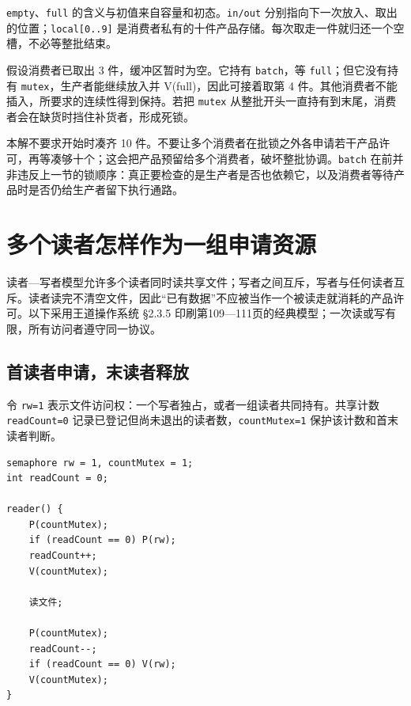\texttt{empty}、\texttt{full} 的含义与初值来自容量和初态。\texttt{in/out} 分别指向下一次放入、取出的位置；\texttt{local{[}0..9{]}} 是消费者私有的十件产品存储。每次取走一件就归还一个空槽，不必等整批结束。

假设消费者已取出 3 件，缓冲区暂时为空。它持有 \texttt{batch}，等 \texttt{full}；但它没有持有 \texttt{mutex}，生产者能继续放入并 V(full)，因此可接着取第 4 件。其他消费者不能插入，所要求的连续性得到保持。若把 \texttt{mutex} 从整批开头一直持有到末尾，消费者会在缺货时挡住补货者，形成死锁。

本解不要求开始时凑齐 10 件。不要让多个消费者在批锁之外各申请若干产品许可，再等凑够十个；这会把产品预留给多个消费者，破坏整批协调。\texttt{batch} 在前并非违反上一节的锁顺序：真正要检查的是生产者是否也依赖它，以及消费者等待产品时是否仍给生产者留下执行通路。

\section{多个读者怎样作为一组申请资源}\label{sec-readers}

读者---写者模型允许多个读者同时读共享文件；写者之间互斥，写者与任何读者互斥。读者读完不清空文件，因此``已有数据''不应被当作一个被读走就消耗的产品许可。以下采用王道操作系统 §2.3.5 印刷第109---111页的经典模型；一次读或写有限，所有访问者遵守同一协议。

\subsection{首读者申请，末读者释放}\label{ux9996ux8bfbux8005ux7533ux8bf7ux672bux8bfbux8005ux91caux653e}

令 \texttt{rw=1} 表示文件访问权：一个写者独占，或者一组读者共同持有。共享计数 \texttt{readCount=0} 记录已登记但尚未退出的读者数，\texttt{countMutex=1} 保护该计数和首末读者判断。

\par\medskip\noindent\begin{minipage}{\linewidth}
\begin{verbatim}
semaphore rw = 1, countMutex = 1;
int readCount = 0;

reader() {
    P(countMutex);
    if (readCount == 0) P(rw);
    readCount++;
    V(countMutex);

    读文件;

    P(countMutex);
    readCount--;
    if (readCount == 0) V(rw);
    V(countMutex);
}
\end{verbatim}
\end{minipage}\par\medskip

